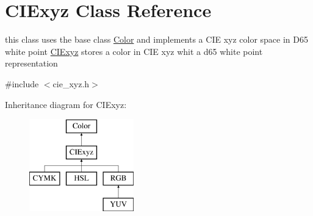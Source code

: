 \hypertarget{class_c_i_exyz}{}\section{C\+I\+Exyz Class Reference}
\label{class_c_i_exyz}


this class uses the base class \hyperlink{class_color}{Color} and implements a C\+IE xyz color space in D65 white point \hyperlink{class_c_i_exyz}{C\+I\+Exyz} stores a color in C\+IE xyz whit a d65 white point representation  




{\ttfamily \#include $<$cie\+\_\+xyz.\+h$>$}

Inheritance diagram for C\+I\+Exyz\+:\begin{figure}[H]
\begin{center}
\leavevmode
\includegraphics[height=4.000000cm]{class_c_i_exyz}
\end{center}
\end{figure}
